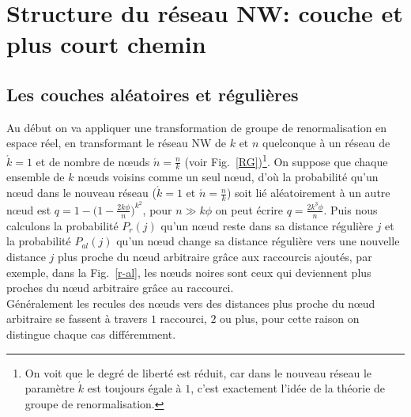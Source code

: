 \section{Structure du réseau NW: couche et plus court chemin }

\subsection{Les couches aléatoires et régulières}
Au début on va appliquer une transformation de groupe de renormalisation en espace réel, en transformant le réseau NW de $k$ et $n$ quelconque à un réseau de $\acute{k}=1$ et de nombre de nœuds {$\acute{n}$}$=\frac{n}{k}$ 
(voir Fig.~\ref{RG})\footnote{On voit que le degré de liberté est réduit, car dans le nouveau réseau le paramètre  $\acute{k}$  est toujours égale à $1$, c'est exactement l'idée de la théorie de groupe de renormalisation.}. On suppose que chaque ensemble de $k$ nœuds voisins comme un seul nœud,  d'où la probabilité qu'un
nœud dans le nouveau réseau ($\acute{k}=1$ et $\acute{n}=\frac{n}{k}$) soit lié aléatoirement à un autre nœud est $q=1-\big(1-\frac{2k\phi}{n}\big)^{k^2}$, pour $n\gg k\phi$ on peut écrire $q=\frac{2k^3\phi}{n}$. Puis nous calculons la probabilité $P_r(j)$ qu'un nœud reste dans sa distance régulière $j$ et la probabilité $P_{al}(j)$ qu'un nœud change sa distance régulière vers une nouvelle distance $j$ plus proche du nœud arbitraire grâce aux raccourcis ajoutés, par exemple, dans la Fig.~\ref{r-al}, les nœuds noires sont ceux qui deviennent plus proches du nœud arbitraire grâce au raccourci.\\ Généralement les recules des nœuds vers des distances plus
proche du nœud arbitraire se fassent à travers $1$ raccourci, $2$ ou plus, pour cette raison on distingue chaque cas différemment.\\

